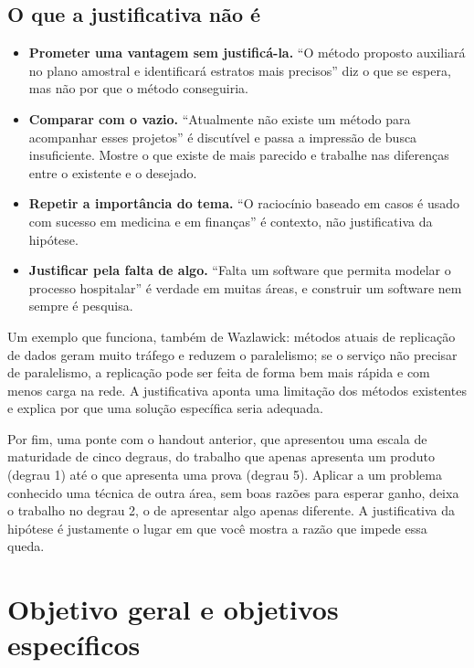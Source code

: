 \documentclass[10pt,a4paper]{extarticle}
\theoremstyle{definition}
\begin{document}
\subsection{O que a justificativa não é}

\begin{warnbox}
\begin{itemize}
  \item \textbf{Prometer uma vantagem sem justificá-la.} \enquote{O método proposto auxiliará no plano amostral e identificará estratos mais precisos} diz o que se espera, mas não por que o método conseguiria.
  \item \textbf{Comparar com o vazio.} \enquote{Atualmente não existe um método para acompanhar esses projetos} é discutível e passa a impressão de busca insuficiente. Mostre o que existe de mais parecido e trabalhe nas diferenças entre o existente e o desejado.
  \item \textbf{Repetir a importância do tema.} \enquote{O raciocínio baseado em casos é usado com sucesso em medicina e em finanças} é contexto, não justificativa da hipótese.
  \item \textbf{Justificar pela falta de algo.} \enquote{Falta um software que permita modelar o processo hospitalar} é verdade em muitas áreas, e construir um software nem sempre é pesquisa.
\end{itemize}
\end{warnbox}

Um exemplo que funciona, também de Wazlawick: métodos atuais de replicação de dados geram muito tráfego e reduzem o paralelismo; se o serviço não precisar de paralelismo, a replicação pode ser feita de forma bem mais rápida e com menos carga na rede. A justificativa aponta uma limitação dos métodos existentes e explica por que uma solução específica seria adequada.

Por fim, uma ponte com o handout anterior, que apresentou uma escala de maturidade de cinco degraus, do trabalho que apenas apresenta um produto (degrau 1) até o que apresenta uma prova (degrau 5). Aplicar a um problema conhecido uma técnica de outra área, sem boas razões para esperar ganho, deixa o trabalho no degrau 2, o de apresentar algo apenas diferente. A justificativa da hipótese é justamente o lugar em que você mostra a razão que impede essa queda.

\pagebreak
\section{Objetivo geral e objetivos específicos}\label{sec:objetivos}
\end{document}
